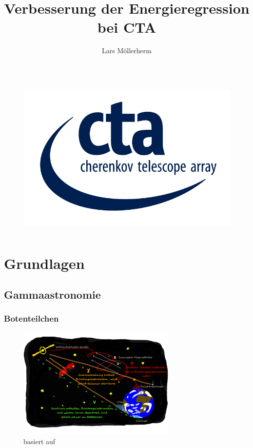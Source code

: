\documentclass[aspectratio=1610, professionalfonts, 9pt]{beamer}
\title{Verbesserung der Energieregression bei CTA}
\author[L.~Möllerherm]{Lars Möllerherm}
\institute[Experimentelle Physik Vb]{Experimentelle Physik Vb \\  Fakultät Physik}
\begin{document}
  \begin{frame}
    \titlepage
  \end{frame}

  \begin{frame}
    \begin{columns}
      \tableofcontents
      \begin{figure}
        \includegraphics{pictures/CTA_logo.jpg}
        \caption{\cite{logo}}
        \label{}
      \end{figure}
    \end{columns}
  \end{frame}

  \section{Grundlagen}
  \subsection{Gammaastronomie}
  \begin{frame}
    \frametitle{Botenteilchen}
      \begin{figure}
        \includegraphics[width=0.7\textwidth]{pictures/Folie5.pdf}
        \caption{basiert auf \cite{Folie5}}
        \label{abb:folie5}
      \end{figure}
  \end{frame}
\end{document}
